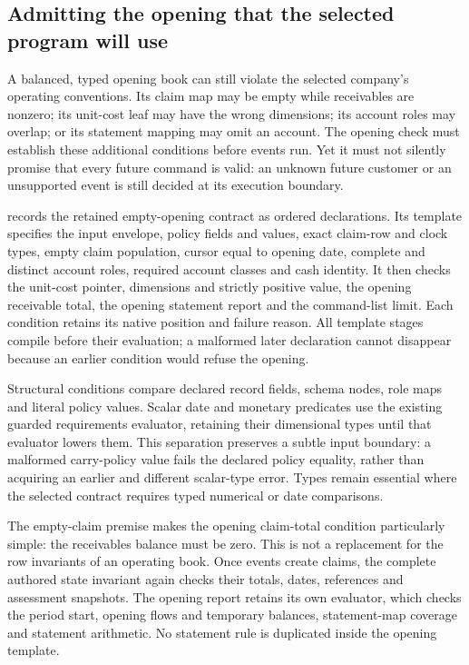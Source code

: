 \subsection{Admitting the opening that the selected program will use}
\label{sec:declared-opening-binding}

A balanced, typed opening book can still violate the selected company's
operating conventions. Its claim map may be empty while receivables are
nonzero; its unit-cost leaf may have the wrong dimensions; its account roles
may overlap; or its statement mapping may omit an account. The opening check
must establish these additional conditions before events run. Yet it must not
silently promise that every future command is valid: an unknown future customer
or an unsupported event is still decided at its execution boundary.

 records the retained empty-opening contract
as ordered declarations. Its template specifies the input envelope, policy
fields and values, exact claim-row and clock types, empty claim population,
cursor equal to opening date, complete and distinct account roles, required
account classes and cash identity. It then checks the unit-cost pointer,
dimensions and strictly positive value, the opening receivable total, the
opening statement report and the command-list limit. Each condition retains
its native position and failure reason. All template stages compile before
their evaluation; a malformed later declaration cannot disappear because an
earlier condition would refuse the opening.

Structural conditions compare declared record fields, schema nodes, role maps
and literal policy values. Scalar date and monetary predicates use the existing
guarded requirements evaluator, retaining their dimensional types until that
evaluator lowers them. This separation preserves a subtle input boundary:
a malformed carry-policy value fails the declared policy equality, rather than
acquiring an earlier and different scalar-type error. Types remain essential
where the selected contract requires typed numerical or date comparisons.

The empty-claim premise makes the opening claim-total condition particularly
simple: the receivables balance must be zero. This is not a replacement for
the row invariants of an operating book. Once events create claims, the complete
authored state invariant again checks their totals, dates, references and
assessment snapshots. The opening report retains its own evaluator, which
checks the period start, opening flows and temporary balances, statement-map
coverage and statement arithmetic. No statement rule is duplicated inside the
opening template.

